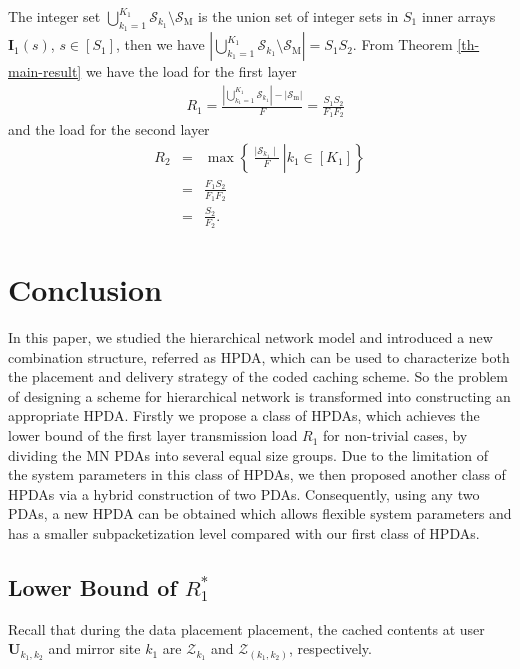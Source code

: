 \documentclass[onecolumn,10pt]{IEEEtran}
\theoremstyle{mythm}
\begin{document}
{ The integer set $\bigcup_{k_1=1}^{K_1}\mathcal{S}_{k_1}\setminus\mathcal{S}_{\text{M}}$ is the union set of  integer sets in $S_1$ inner arrays $\mathbf{I}_1(s)$, $s\in[S_1]$, then we have $|\bigcup_{k_1=1}^{K_1}\mathcal{S}_{k_1}\setminus\mathcal{S}_{\text{M}}|=S_1S_2$. From Theorem \ref{th-main-result} we have the load for the first layer
\begin{eqnarray*}
&R_1=\frac{|\bigcup_{k_1=1}^{K_1}\mathcal{S}_{k_1}|-|\mathcal{S}_\text{m}|}{F}
=\frac{S_1S_2}{F_1F_2}
\end{eqnarray*} and the load for the second layer
\begin{eqnarray*}
R_2&=&\max\left.\left\{\  \frac{\mid\mathcal{S}_{k_1}\mid}{F}\ \right| k_1\in[K_1]  \right\}\\
&=&\frac{F_1S_2}{F_1F_2}\\
&=&\frac{S_2}{F_2}.
\end{eqnarray*}
\section{Conclusion}
\label{sec:7}
In this paper, we studied the hierarchical network model and introduced a new combination structure, referred as HPDA, which can be used to characterize both the placement and delivery strategy of the coded caching scheme. So the problem of designing a scheme for hierarchical network is transformed into constructing an appropriate HPDA. Firstly we propose a class of HPDAs, which achieves the lower bound of the first layer transmission load $R_1$ for non-trivial cases, by dividing the MN PDAs into several equal size groups. Due to the limitation of the system parameters in this class of HPDAs,  we then proposed another class of HPDAs via a hybrid construction of two PDAs. Consequently, using any two PDAs, a new HPDA can be obtained which   allows   flexible system parameters and has a smaller subpacketization level compared with our first class of HPDAs.

\begin{appendices}
\section{Lower Bound of $R^*_1$}
\label{appendix-optimal}
Recall that during the data placement placement, the cached contents at user $\mathbf{U}_{k_1,k_2}$ and mirror site $k_1$ are  $\mathcal{Z}_{k_1}$ and $\mathcal{Z}_{(k_1,k_2)}$, respectively.


\end{appendices}}
\end{document}
